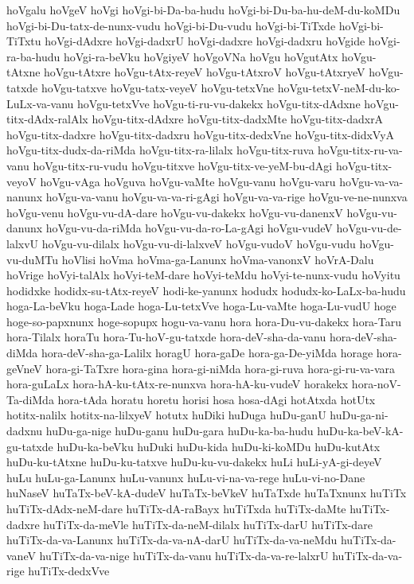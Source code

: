 {hoVgalu
hoVgeV
hoVgi
hoVgi-bi-Da-ba-hudu
hoVgi-bi-Du-ba-hu-deM-du-koMDu
hoVgi-bi-Du-tatx-de-nunx-vudu
hoVgi-bi-Du-vudu
hoVgi-bi-TiTxde
hoVgi-bi-TiTxtu
hoVgi-dAdxre
hoVgi-dadxrU
hoVgi-dadxre
hoVgi-dadxru
hoVgide
hoVgi-ra-ba-hudu
hoVgi-ra-beVku
hoVgiyeV
hoVgoVNa
hoVgu
hoVgutAtx
hoVgu-tAtxne
hoVgu-tAtxre
hoVgu-tAtx-reyeV
hoVgu-tAtxroV
hoVgu-tAtxryeV
hoVgu-tatxde
hoVgu-tatxve
hoVgu-tatx-veyeV
hoVgu-tetxVne
hoVgu-tetxV-neM-du-ko-LuLx-va-vanu
hoVgu-tetxVve
hoVgu-ti-ru-vu-dakekx
hoVgu-titx-dAdxne
hoVgu-titx-dAdx-ralAlx
hoVgu-titx-dAdxre
hoVgu-titx-dadxMte
hoVgu-titx-dadxrA
hoVgu-titx-dadxre
hoVgu-titx-dadxru
hoVgu-titx-dedxVne
hoVgu-titx-didxVyA
hoVgu-titx-dudx-da-riMda
hoVgu-titx-ra-lilalx
hoVgu-titx-ruva
hoVgu-titx-ru-va-vanu
hoVgu-titx-ru-vudu
hoVgu-titxve
hoVgu-titx-ve-yeM-bu-dAgi
hoVgu-titx-veyoV
hoVgu-vAga
hoVguva
hoVgu-vaMte
hoVgu-vanu
hoVgu-varu
hoVgu-va-va-nanunx
hoVgu-va-vanu
hoVgu-va-va-ri-gAgi
hoVgu-va-va-rige
hoVgu-ve-ne-nunxva
hoVgu-venu
hoVgu-vu-dA-dare
hoVgu-vu-dakekx
hoVgu-vu-danenxV
hoVgu-vu-danunx
hoVgu-vu-da-riMda
hoVgu-vu-da-ro-La-gAgi
hoVgu-vudeV
hoVgu-vu-de-lalxvU
hoVgu-vu-dilalx
hoVgu-vu-di-lalxveV
hoVgu-vudoV
hoVgu-vudu
hoVgu-vu-duMTu
hoVlisi
hoVma
hoVma-ga-Lanunx
hoVma-vanonxV
hoVrA-Dalu
hoVrige
hoVyi-talAlx
hoVyi-teM-dare
hoVyi-teMdu
hoVyi-te-nunx-vudu
hoVyitu
hodidxke
hodidx-su-tAtx-reyeV
hodi-ke-yanunx
hodudx
hodudx-ko-LaLx-ba-hudu
hoga-La-beVku
hoga-Lade
hoga-Lu-tetxVve
hoga-Lu-vaMte
hoga-Lu-vudU
hoge
hoge-so-papxnunx
hoge-sopupx
hogu-va-vanu
hora
hora-Du-vu-dakekx
hora-Taru
hora-Tilalx
horaTu
hora-Tu-hoV-gu-tatxde
hora-deV-sha-da-vanu
hora-deV-sha-diMda
hora-deV-sha-ga-Lalilx
horagU
hora-gaDe
hora-ga-De-yiMda
horage
hora-geVneV
hora-gi-TaTxre
hora-gina
hora-gi-niMda
hora-gi-ruva
hora-gi-ru-va-vara
hora-guLaLx
hora-hA-ku-tAtx-re-nunxva
hora-hA-ku-vudeV
horakekx
hora-noV-Ta-diMda
hora-tAda
horatu
horetu
horisi
hosa
hosa-dAgi
hotAtxda
hotUtx
hotitx-nalilx
hotitx-na-lilxyeV
hotutx
huDiki
huDuga
huDu-ganU
huDu-ga-ni-dadxnu
huDu-ga-nige
huDu-ganu
huDu-gara
huDu-ka-ba-hudu
huDu-ka-beV-kA-gu-tatxde
huDu-ka-beVku
huDuki
huDu-kida
huDu-ki-koMDu
huDu-kutAtx
huDu-ku-tAtxne
huDu-ku-tatxve
huDu-ku-vu-dakekx
huLi
huLi-yA-gi-deyeV
huLu
huLu-ga-Lanunx
huLu-vanunx
huLu-vi-na-va-rege
huLu-vi-no-Dane
huNaseV
huTaTx-beV-kA-dudeV
huTaTx-beVkeV
huTaTxde
huTaTxnunx
huTiTx
huTiTx-dAdx-neM-dare
huTiTx-dA-raBayx
huTiTxda
huTiTx-daMte
huTiTx-dadxre
huTiTx-da-meVle
huTiTx-da-neM-dilalx
huTiTx-darU
huTiTx-dare
huTiTx-da-va-Lanunx
huTiTx-da-va-nA-darU
huTiTx-da-va-neMdu
huTiTx-da-vaneV
huTiTx-da-va-nige
huTiTx-da-vanu
huTiTx-da-va-re-lalxrU
huTiTx-da-va-rige
huTiTx-dedxVve
}
